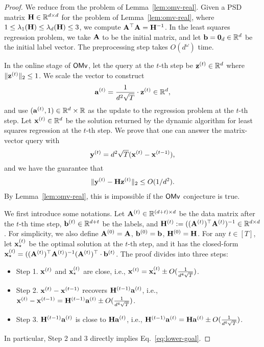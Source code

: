 \begin{proof}
We reduce from the problem of Lemma~\ref{lem:omv-real}.
Given a PSD matrix $\mathbf{H} \in \mathbb{R}^{d\times d}$ for the problem of Lemma~\ref{lem:omv-real}, where $1\leq \lambda_1(\mathbf{H}) \leq \lambda_{d}(\mathbf{H}) \leq 3$, we compute $\mathbf{A}^{\top}\mathbf{A} = \mathbf{H}^{-1}$.
In the least squares regression problem, we take $\mathbf{A}$ to be the initial matrix, and let $\mathbf{b} = \mathbf{0}_d \in \mathbb{R}^{d}$ be the initial label vector.
The preprocessing step takes $O(d^\omega)$ time.

In the online stage of $\mathsf{OMv}$, let the query at the $t$-th step be $\mathbf{z}^{(t)} \in \mathbb{R}^d$ where $\|\mathbf{z}^{(t)}\|_2 \leq 1$. 
We scale the vector to construct 
\[
\mathbf{a}^{(t)} = \frac{1}{d^2\sqrt{T}}\cdot \mathbf{z}^{(t)} \in \mathbb{R}^{d},
\]
and use $(\mathbf{a}^{(t)}, 1)\in \mathbb{R}^{d} \times \mathbb{R}$ as the update to the regression problem at the $t$-th step.
Let $\mathbf{x}^{(t)} \in \mathbb{R}^d$ be the solution returned by the dynamic algorithm for least squares regression at the $t$-th step. We prove that one can answer the matrix-vector query with 
\[
\mathbf{y}^{(t)} = d^2\sqrt{T} (\mathbf{x}^{(t)} - \mathbf{x}^{(t-1)}),
\]
and we have the guarantee that
\begin{align}
\|\mathbf{y}^{(t)} - \mathbf{H} \mathbf{z}^{(t)}\|_2\leq O(1/d^2).
\label{eq:lower-goal}
\end{align}
By Lemma~\ref{lem:omv-real}, this is impossible if the $\mathsf{OMv}$ conjecture is true.

We first introduce some notations.
Let $\mathbf{A}^{(t)} \in \mathbb{R}^{(d+t) \times d}$ be the data matrix after the $t$-th time step, $\mathbf{b}^{(t)} \in \mathbb{R}^{d+t}$ be the labels, and $\mathbf{H}^{(t)} := ((\mathbf{A}^{(t)})^{\top} \mathbf{A}^{(t)})^{-1} \in \mathbb{R}^{d\times d}$.
For simplicity, we also define $\mathbf{A}^{(0)} = \mathbf{A}$, $\mathbf{b}^{(0)} = \mathbf{b}$, $\mathbf{H}^{(0)} = \mathbf{H}$.
For any $t\in [T]$, let $\mathbf{x}_{\star}^{(t)}$ be the optimal solution at the $t$-th step, and it has the closed-form $\mathbf{x}_{\star}^{(t)} = ((\mathbf{A}^{(t)})^{\top} \mathbf{A}^{(t)})^{-1} (\mathbf{A}^{(t)})^{\top} \cdot \mathbf{b}^{(t)}$. The proof divides into three steps:
\begin{itemize}
    \item Step 1. $\mathbf{x}^{(t)}$ and $\mathbf{x}_{\star}^{(t)}$ are close, i.e., $\mathbf{x}^{(t)} = \mathbf{x}_{\star}^{(t)} \pm O(\frac{1}{d^4\sqrt{T}})$.
    \item Step 2. $\mathbf{x}^{(t)} - \mathbf{x}^{(t-1)}$ recovers $\mathbf{H}^{(t-1)} \mathbf{a}^{(t)}$, i.e., $\mathbf{x}^{(t)} - \mathbf{x}^{(t-1)} = \mathbf{H}^{(t-1)} \mathbf{a}^{(t)} \pm O(\frac{1}{d^4\sqrt{T}})$.
    \item Step 3. $\mathbf{H}^{(t-1)} \mathbf{a}^{(t)}$ is close to $\mathbf{H} \mathbf{a}^{(t)}$, i.e., $\mathbf{H}^{(t-1)} \mathbf{a}^{(t)} = \mathbf{H} \mathbf{a}^{(t)} \pm O(\frac{1}{d^6\sqrt{T}})$.
\end{itemize}
In particular, Step 2 and 3 directly implies Eq.~\eqref{eq:lower-goal}.


\end{proof}

